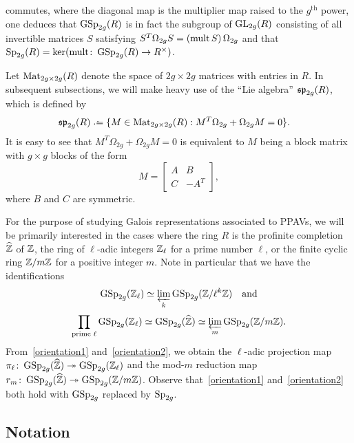 \noindent commutes, where the diagonal map is the multiplier map raised to the $g^{\mathrm{th}}$ power, one deduces that $\operatorname{GSp}_{2g}(R)$ is in fact the subgroup of $\operatorname{GL}_{2g}(R)$ consisting of all invertible matrices $S$ satisfying $S^T \Omega_{2g} S = (\operatorname{mult} S) \, \Omega_{2g}$ and that $\operatorname{Sp}_{2g}(R) = \ker(\operatorname{mult} \colon \operatorname{GSp}_{2g}(R) \to R^\times)$.

Let $\operatorname{Mat}_{2g \times 2g}(R)$ denote the space of $2g \times 2g$ matrices with entries in $R$. In subsequent subsections, we will make heavy use of the ``Lie algebra'' $\mathfrak{sp}_{2g}(R)$, which is defined by
		\begin{align*}
			\mf{sp}_{2g}(R) &\defeq \{M \in \on{Mat}_{2g \times 2g}(R) : M^T \Omega_{2g} + \Omega_{2g} M = 0 \}.
		\end{align*}
		It is easy to see that $M^T \Omega_{2g} + \Omega_{2g}M = 0$ is equivalent to $M$ being a block matrix with $g \times g$ blocks of the form
		\[
			M = \left[\begin{array}{c|c} A & B \\ \hline C & -A^T \end{array}\right],
		\]
		where $B$ and $C$ are symmetric.

For the purpose of studying Galois representations associated to PPAVs, we will be primarily interested in the cases where the ring $R$ is the profinite completion $\widehat{\mathbb Z}$ of $\mathbb Z$, the ring of $\ell$-adic integers $\mathbb Z_{\ell}$ for a prime number $\ell$, or the finite cyclic ring $\mathbb Z / m \mathbb Z$ for a positive integer $m$.
Note in particular that we have the identifications
\begin{equation}\label{orientation1}
\operatorname{GSp}_{2g}(\mathbb Z_\ell)   \simeq  \varprojlim_k \operatorname{GSp}_{2g}(\mathbb Z/ \ell^k \mathbb Z) \quad \text{and}
\end{equation}
\begin{equation}\label{orientation2}
\prod_{\text{prime } \ell} \operatorname{GSp}_{2g}(\mathbb Z_\ell) \simeq  \operatorname{GSp}_{2g}(\widehat{\mathbb Z}) \simeq  \varprojlim_m \operatorname{GSp}_{2g}(\mathbb Z / m \mathbb Z).
\end{equation}
From~\eqref{orientation1} and~\eqref{orientation2}, we obtain the $\ell$-adic projection map $\pi_\ell \colon \operatorname{GSp}_{2g}(\widehat{\mathbb Z}) \twoheadrightarrow \operatorname{GSp}_{2g}(\mathbb Z_\ell)$ and the mod-$m$ reduction map $r_m \colon \operatorname{GSp}_{2g}(\widehat{\mathbb Z}) \twoheadrightarrow \operatorname{GSp}_{2g}(\mathbb Z / m \mathbb Z)$. Observe that~\eqref{orientation1} and~\eqref{orientation2} both hold with $\operatorname{GSp}_{2g}$ replaced by $\operatorname{Sp}_{2g}$.



\subsection{Notation}
\label{subsection:notation}

